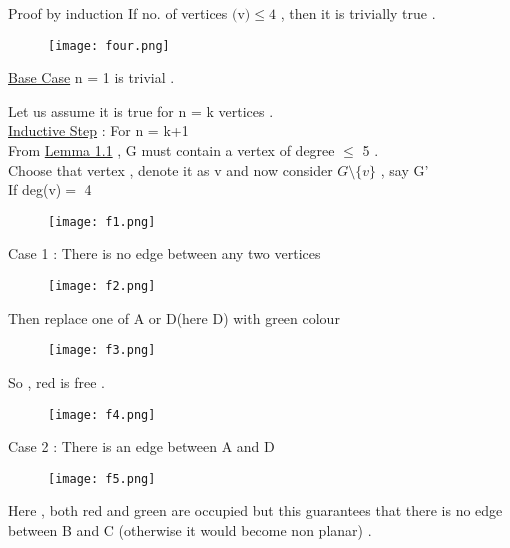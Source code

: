\documentclass[12pt]{beamer}
\begin{document}
\begin{frame}{Proof by induction}
If no. of vertices $($v$)\leq 4$ , then it is trivially true . \\
\begin{figure}
\texttt{[image: four.png]}
\end{figure}
\end{frame}

\begin{frame}
\underline {\large{Base Case}} n = 1 is trivial .

Let us assume it is true for n = k vertices .\\
\underline {\large{Inductive Step}} : For n = k+1 \\
From \hyperlink{page.24}{Lemma 1.1} , G must contain a vertex of degree $\leq$ 5 . \\
Choose that vertex , denote it as v and now consider $G \setminus \{v\}$ , say G'\\
If deg(v)$=$ 4
\begin{figure}
\texttt{[image: f1.png]}
\end{figure}
\end{frame}

\begin{frame} 
Case 1 : There is no edge between any two vertices
\begin{figure}
\texttt{[image: f2.png]}

\end{figure}

Then replace one of A or D(here D) with green colour 
\end{frame}

\begin{frame} 
\begin{figure}
\texttt{[image: f3.png]}
\end{figure}

So , red is free .
\end{frame}

\begin{frame} 
\begin{figure}
\texttt{[image: f4.png]}
\end{figure}
\end{frame}

\begin{frame} 
Case 2 : There is an edge between A and D
\begin{figure}
\texttt{[image: f5.png]}

\end{figure}

Here , both red and green are occupied but this guarantees that there is no edge between B and C (otherwise it would become non planar) .
\end{frame}
\end{document}
